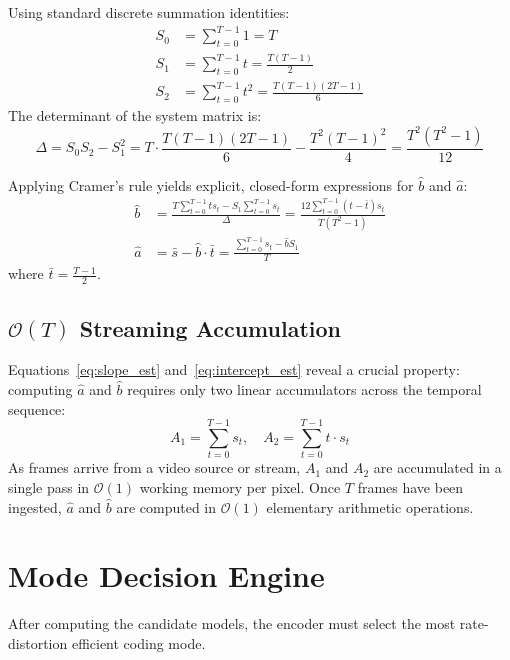 Using standard discrete summation identities:
\begin{align}
    S_0 &= \sum_{t=0}^{T-1} 1 = T \\
    S_1 &= \sum_{t=0}^{T-1} t = \frac{T(T-1)}{2} \\
    S_2 &= \sum_{t=0}^{T-1} t^2 = \frac{T(T-1)(2T-1)}{6}
\end{align}
The determinant of the system matrix is:
\begin{equation}
    \Delta = S_0 S_2 - S_1^2 = T \cdot \frac{T(T-1)(2T-1)}{6} - \frac{T^2(T-1)^2}{4} = \frac{T^2(T^2 - 1)}{12}
\end{equation}

Applying Cramer's rule yields explicit, closed-form expressions for $\hat{b}$ and $\hat{a}$:
\begin{align}
    \hat{b} &= \frac{T \sum_{t=0}^{T-1} t s_t - S_1 \sum_{t=0}^{T-1} s_t}{\Delta} = \frac{12 \sum_{t=0}^{T-1} (t - \bar{t}) s_t}{T(T^2 - 1)} \label{eq:slope_est} \\
    \hat{a} &= \bar{s} - \hat{b} \cdot \bar{t} = \frac{\sum_{t=0}^{T-1} s_t - \hat{b} S_1}{T} \label{eq:intercept_est}
\end{align}
where $\bar{t} = \frac{T-1}{2}$. 

\subsection{$\mathcal{O}(T)$ Streaming Accumulation}
Equations~\eqref{eq:slope_est} and~\eqref{eq:intercept_est} reveal a crucial property: computing $\hat{a}$ and $\hat{b}$ requires only two linear accumulators across the temporal sequence:
\begin{equation}
    A_1 = \sum_{t=0}^{T-1} s_t, \quad A_2 = \sum_{t=0}^{T-1} t \cdot s_t
\end{equation}
As frames arrive from a video source or stream, $A_1$ and $A_2$ are accumulated in a single pass in $\mathcal{O}(1)$ working memory per pixel. Once $T$ frames have been ingested, $\hat{a}$ and $\hat{b}$ are computed in $\mathcal{O}(1)$ elementary arithmetic operations.

\section{Mode Decision Engine}
After computing the candidate models, the encoder must select the most rate-distortion efficient coding mode. 


